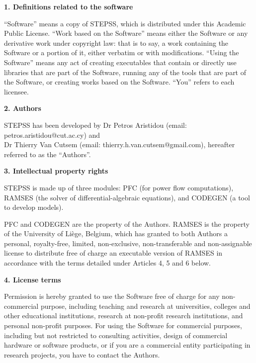 \vspace*{5ex}
\begin{center}
\end{center}

{\bf \large 1. Definitions related to the software}

``Software'' means a copy of STEPSS, which is distributed under this Academic Public License. ``Work based on the Software'' means either the Software or any derivative work under copyright law: that is to say, a work containing the Software or a portion of it, either verbatim or with modifications. ``Using the Software'' means any act of creating executables that contain or directly use libraries that are part of the Software, running any of the tools that are part of the Software, or creating works based on the Software. ``You'' refers to each licensee.

{\bf \large 2. Authors}

STEPSS has been developed by Dr Petros Aristidou (email: petros.aristidou@cut.ac.cy) and\\
Dr Thierry Van Cutsem (email: thierry.h.van.cutsem@gmail.com), hereafter referred to as the ``Authors''.

{\bf \large 3. Intellectual property rights}

STEPSS is made up of three modules: PFC (for power flow computations), RAMSES (the solver of differential-algebraic equations), and CODEGEN (a tool to develop models).

PFC and CODEGEN are the property of the Authors. RAMSES is the property of the University of Li\`ege, Belgium, which has granted to both Authors a personal, royalty-free, limited, non-exclusive, non-transferable and non-assignable license to distribute free of charge an executable version of RAMSES in accordance with the terms detailed under Articles 4, 5 and 6 below.

{\bf \large 4. License terms}

Permission is hereby granted to use the Software free of charge for any non-commercial purpose, including teaching and research at universities, colleges and other educational institutions, research at non-profit research institutions, and personal non-profit purposes. For using the Software for commercial purposes, including but not restricted to consulting activities, design of commercial hardware or software products, or if you are a commercial entity participating in research projects, you have to contact the Authors.

